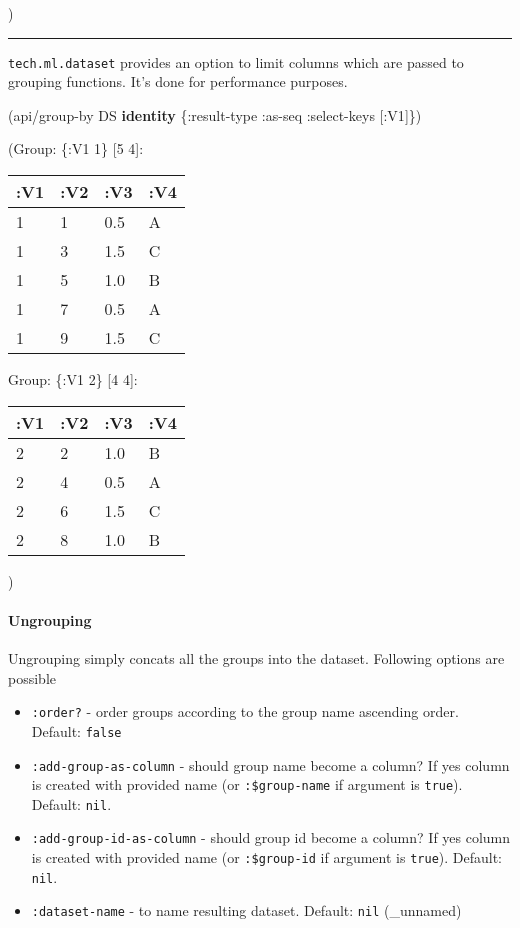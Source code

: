 \documentclass[]{article}
\newenvironment{Shaded}{\begin{snugshade}}{\end{snugshade}}
\newcommand{\AttributeTok}[1]{\textcolor[rgb]{0.77,0.63,0.00}{#1}}
\newcommand{\KeywordTok}[1]{\textcolor[rgb]{0.13,0.29,0.53}{\textbf{#1}}}
\newcommand{\NormalTok}[1]{#1}
\providecommand{\tightlist}{%
  \setlength{\itemsep}{0pt}\setlength{\parskip}{0pt}}
\let\oldparagraph\paragraph
\renewcommand{\paragraph}[1]{\oldparagraph{#1}\mbox{}}
\begin{document}
)

\begin{center}\rule{0.5\linewidth}{0.5pt}\end{center}

\texttt{tech.ml.dataset} provides an option to limit columns which are
passed to grouping functions. It's done for performance purposes.

\begin{Shaded}
\begin{Highlighting}[]
\NormalTok{(api/group-by DS }\KeywordTok{identity}\NormalTok{ \{}\AttributeTok{:result-type} \AttributeTok{:as-seq}
                           \AttributeTok{:select-keys}\NormalTok{ [}\AttributeTok{:V1}\NormalTok{]\})}
\end{Highlighting}
\end{Shaded}

(Group: \{:V1 1\} {[}5 4{]}:

\begin{longtable}[]{@{}llll@{}}
\toprule
:V1 & :V2 & :V3 & :V4\tabularnewline
\midrule
\endhead
1 & 1 & 0.5 & A\tabularnewline
1 & 3 & 1.5 & C\tabularnewline
1 & 5 & 1.0 & B\tabularnewline
1 & 7 & 0.5 & A\tabularnewline
1 & 9 & 1.5 & C\tabularnewline
\bottomrule
\end{longtable}

Group: \{:V1 2\} {[}4 4{]}:

\begin{longtable}[]{@{}llll@{}}
\toprule
:V1 & :V2 & :V3 & :V4\tabularnewline
\midrule
\endhead
2 & 2 & 1.0 & B\tabularnewline
2 & 4 & 0.5 & A\tabularnewline
2 & 6 & 1.5 & C\tabularnewline
2 & 8 & 1.0 & B\tabularnewline
\bottomrule
\end{longtable}

)

\hypertarget{ungrouping}{%
\paragraph{Ungrouping}\label{ungrouping}}

Ungrouping simply concats all the groups into the dataset. Following
options are possible

\begin{itemize}
\tightlist
\item
  \texttt{:order?} - order groups according to the group name ascending
  order. Default: \texttt{false}
\item
  \texttt{:add-group-as-column} - should group name become a column? If
  yes column is created with provided name (or \texttt{:\$group-name} if
  argument is \texttt{true}). Default: \texttt{nil}.
\item
  \texttt{:add-group-id-as-column} - should group id become a column? If
  yes column is created with provided name (or \texttt{:\$group-id} if
  argument is \texttt{true}). Default: \texttt{nil}.
\item
  \texttt{:dataset-name} - to name resulting dataset. Default:
  \texttt{nil} (\_unnamed)
\end{itemize}
\end{document}

